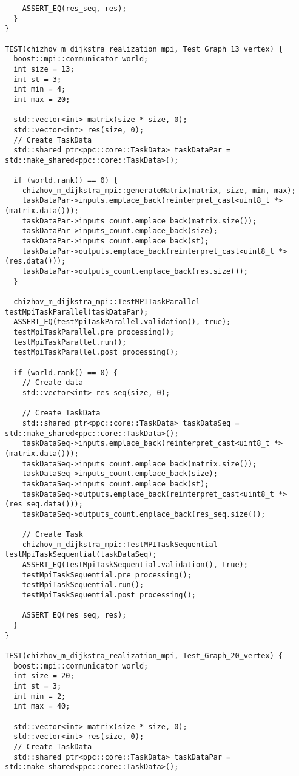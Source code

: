 \documentclass[a4paper, 14pt]{extarticle}
\begin{document}
\begin{lstlisting}
    ASSERT_EQ(res_seq, res);
  }
}

TEST(chizhov_m_dijkstra_realization_mpi, Test_Graph_13_vertex) {
  boost::mpi::communicator world;
  int size = 13;
  int st = 3;
  int min = 4;
  int max = 20;

  std::vector<int> matrix(size * size, 0);
  std::vector<int> res(size, 0);
  // Create TaskData
  std::shared_ptr<ppc::core::TaskData> taskDataPar = std::make_shared<ppc::core::TaskData>();

  if (world.rank() == 0) {
    chizhov_m_dijkstra_mpi::generateMatrix(matrix, size, min, max);
    taskDataPar->inputs.emplace_back(reinterpret_cast<uint8_t *>(matrix.data()));
    taskDataPar->inputs_count.emplace_back(matrix.size());
    taskDataPar->inputs_count.emplace_back(size);
    taskDataPar->inputs_count.emplace_back(st);
    taskDataPar->outputs.emplace_back(reinterpret_cast<uint8_t *>(res.data()));
    taskDataPar->outputs_count.emplace_back(res.size());
  }

  chizhov_m_dijkstra_mpi::TestMPITaskParallel testMpiTaskParallel(taskDataPar);
  ASSERT_EQ(testMpiTaskParallel.validation(), true);
  testMpiTaskParallel.pre_processing();
  testMpiTaskParallel.run();
  testMpiTaskParallel.post_processing();

  if (world.rank() == 0) {
    // Create data
    std::vector<int> res_seq(size, 0);

    // Create TaskData
    std::shared_ptr<ppc::core::TaskData> taskDataSeq = std::make_shared<ppc::core::TaskData>();
    taskDataSeq->inputs.emplace_back(reinterpret_cast<uint8_t *>(matrix.data()));
    taskDataSeq->inputs_count.emplace_back(matrix.size());
    taskDataSeq->inputs_count.emplace_back(size);
    taskDataSeq->inputs_count.emplace_back(st);
    taskDataSeq->outputs.emplace_back(reinterpret_cast<uint8_t *>(res_seq.data()));
    taskDataSeq->outputs_count.emplace_back(res_seq.size());

    // Create Task
    chizhov_m_dijkstra_mpi::TestMPITaskSequential testMpiTaskSequential(taskDataSeq);
    ASSERT_EQ(testMpiTaskSequential.validation(), true);
    testMpiTaskSequential.pre_processing();
    testMpiTaskSequential.run();
    testMpiTaskSequential.post_processing();

    ASSERT_EQ(res_seq, res);
  }
}

TEST(chizhov_m_dijkstra_realization_mpi, Test_Graph_20_vertex) {
  boost::mpi::communicator world;
  int size = 20;
  int st = 3;
  int min = 2;
  int max = 40;

  std::vector<int> matrix(size * size, 0);
  std::vector<int> res(size, 0);
  // Create TaskData
  std::shared_ptr<ppc::core::TaskData> taskDataPar = std::make_shared<ppc::core::TaskData>();


\end{lstlisting}
\end{document}
